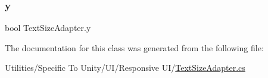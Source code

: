 \mbox{\label{class_text_size_adapter_abd34c0121bd74a15606655584f4662f6}} 
\subsubsection{\texorpdfstring{y}{y}}
{\footnotesize\ttfamily bool Text\+Size\+Adapter.\+y}



The documentation for this class was generated from the following file\+:\begin{DoxyCompactItemize}
\item 
Utilities/\+Specific To Unity/\+U\+I/\+Responsive U\+I/\hyperlink{_text_size_adapter_8cs}{Text\+Size\+Adapter.\+cs}\end{DoxyCompactItemize}
